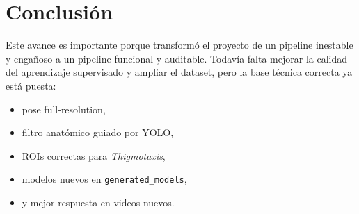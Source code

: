 \documentclass[12pt,a4paper]{article}
\begin{document}
\section{Conclusi\'on}
Este avance es importante porque transform\'o el proyecto de un pipeline inestable y enga\~noso a un pipeline funcional y auditable. Todav\'ia falta mejorar la calidad del aprendizaje supervisado y ampliar el dataset, pero la base t\'ecnica correcta ya est\'a puesta:
\begin{itemize}[leftmargin=1.5cm]
    \item pose full-resolution,
    \item filtro anat\'omico guiado por YOLO,
    \item ROIs correctas para \textit{Thigmotaxis},
    \item modelos nuevos en \texttt{generated\_models},
    \item y mejor respuesta en videos nuevos.
\end{itemize}
\end{document}
